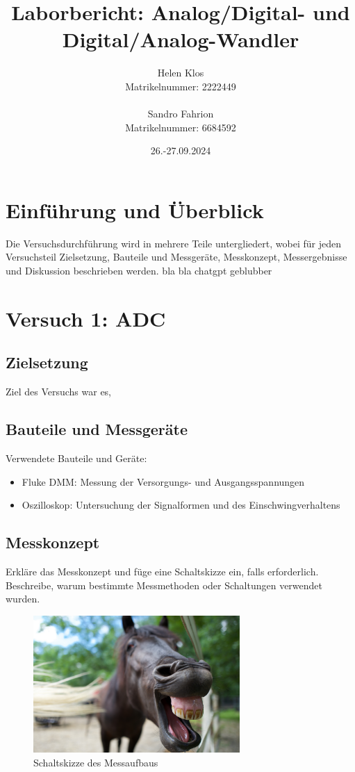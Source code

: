 \documentclass[a4paper,12pt]{article}
\title{Laborbericht: Analog/Digital- und Digital/Analog-Wandler}
\author{Helen Klos \\Matrikelnummer: 2222449 \\ \\Sandro Fahrion \\Matrikelnummer: 6684592}
\date{26.-27.09.2024}
\begin{document}
\maketitle

\tableofcontents
\newpage

\section{Einführung und Überblick}
Die Versuchsdurchführung wird in mehrere Teile untergliedert, wobei für jeden Versuchsteil Zielsetzung, Bauteile und Messgeräte, Messkonzept, Messergebnisse und Diskussion beschrieben werden.
bla bla chatgpt geblubber

\section{Versuch 1: ADC}

\subsection{Zielsetzung}
Ziel des Versuchs war es, 

\subsection{Bauteile und Messgeräte}
Verwendete Bauteile und Geräte:
\begin{itemize}
\item Fluke DMM: Messung der Versorgungs- und Ausgangsspannungen
\item Oszilloskop: Untersuchung der Signalformen und des Einschwingverhaltens
\end{itemize}

\subsection{Messkonzept}
Erkläre das Messkonzept und füge eine Schaltskizze ein, falls erforderlich. Beschreibe,
warum bestimmte Messmethoden oder Schaltungen verwendet wurden.

\begin{figure}[H]
    \centering
    \includegraphics[width=0.7\textwidth]{Schaltskizze.jpg} %
    \caption{Schaltskizze des Messaufbaus}
\end{figure}
\end{document}
